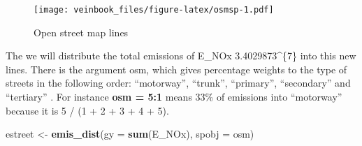 \documentclass[12pt,graybox,envcountchap,sectrefs]{krantz}
\makeatletter
\newenvironment{Shaded}{\begin{snugshade}}{\end{snugshade}}
\newcommand{\KeywordTok}[1]{\textcolor[rgb]{0.13,0.29,0.53}{\textbf{#1}}}
\newcommand{\DataTypeTok}[1]{\textcolor[rgb]{0.13,0.29,0.53}{#1}}
\newcommand{\StringTok}[1]{\textcolor[rgb]{0.31,0.60,0.02}{#1}}
\newcommand{\OperatorTok}[1]{\textcolor[rgb]{0.81,0.36,0.00}{\textbf{#1}}}
\newcommand{\NormalTok}[1]{#1}
\newenvironment{kframe}{%
\medskip{}
\setlength{\fboxsep}{.8em}
 \def\at@end@of@kframe{}%
 \ifinner\ifhmode%
  \def\at@end@of@kframe{\end{minipage}}%
  \begin{minipage}{\columnwidth}%
 \fi\fi%
 \def\FrameCommand##1{\hskip\@totalleftmargin \hskip-\fboxsep
 \colorbox{shadecolor}{##1}\hskip-\fboxsep
     \hskip-\linewidth \hskip-\@totalleftmargin \hskip\columnwidth}%
 \MakeFramed {\advance\hsize-\width
   \@totalleftmargin\z@ \linewidth\hsize
   \@setminipage}}%
 {\par\unskip\endMakeFramed%
 \at@end@of@kframe}
\renewenvironment{Shaded}{\begin{kframe}}{\end{kframe}}
\theoremstyle{definition}
\theoremstyle{definition}
\theoremstyle{definition}
\theoremstyle{remark}
\makeatother
\begin{document}
\begin{Shaded}
\end{Shaded}

\begin{figure}
\centering
\texttt{[image: veinbook\_files/figure-latex/osmsp-1.pdf]}
\caption{\label{fig:osmsp}Open street map lines}
\end{figure}

The we will distribute the total emissions of E\_NOx
3.4029873\^{}\{7\} into this new lines. There is the argument
osm, which gives percentage weights to the type of streets in the
following order: ``motorway'', ``trunk'', ``primary'', ``secondary'' and
``tertiary'' . For instance \textbf{osm = 5:1} means 33\% of emissions
into ``motorway'' because it is 5 / (1 + 2 + 3 + 4 + 5).

\begin{Shaded}
\begin{Highlighting}[]
\NormalTok{estreet <-}\StringTok{ }\KeywordTok{emis_dist}\NormalTok{(}\DataTypeTok{gy =} \KeywordTok{sum}\NormalTok{(E_NOx), }\DataTypeTok{spobj =}\NormalTok{ osm)}
\end{Highlighting}
\end{Shaded}
\end{document}

